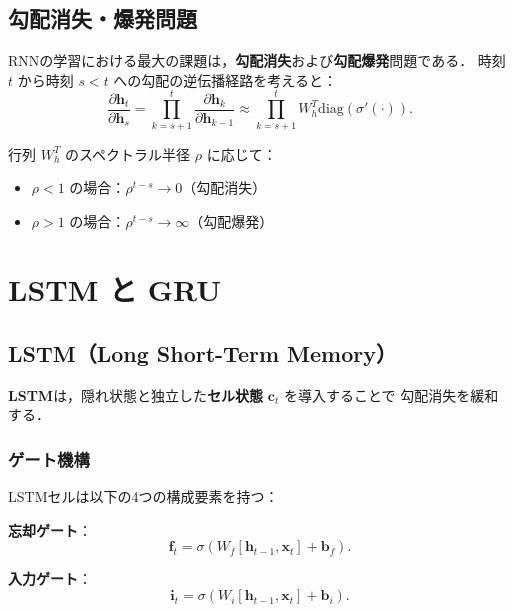 \subsection{勾配消失・爆発問題}

RNNの学習における最大の課題は，\textbf{勾配消失}および\textbf{勾配爆発}問題である．
時刻 $t$ から時刻 $s < t$ への勾配の逆伝播経路を考えると：
\begin{equation}
  \frac{\partial \boldsymbol{h}_t}{\partial \boldsymbol{h}_s} = \prod_{k=s+1}^{t} \frac{\partial \boldsymbol{h}_k}{\partial \boldsymbol{h}_{k-1}} \approx \prod_{k=s+1}^{t} W_h^T \mathrm{diag}(\sigma'(\cdot)).
\end{equation}

行列 $W_h^T$ のスペクトラル半径 $\rho$ に応じて：
\begin{itemize}
  \item $\rho < 1$ の場合：$\rho^{t-s} \to 0$（勾配消失）
  \item $\rho > 1$ の場合：$\rho^{t-s} \to \infty$（勾配爆発）
\end{itemize}

\section{LSTM と GRU}
\label{sec:lstm-gru}

\subsection{LSTM（Long Short-Term Memory）}

\textbf{LSTM}\cite{Hochreiter1997}は，隠れ状態と独立した\textbf{セル状態} $\boldsymbol{c}_t$ を導入することで
勾配消失を緩和する．

\subsubsection{ゲート機構}

LSTMセルは以下の4つの構成要素を持つ：

\textbf{忘却ゲート}：
\begin{equation}
  \boldsymbol{f}_t = \sigma(W_f[\boldsymbol{h}_{t-1}, \boldsymbol{x}_t] + \boldsymbol{b}_f).
\end{equation}

\textbf{入力ゲート}：
\begin{equation}
  \boldsymbol{i}_t = \sigma(W_i[\boldsymbol{h}_{t-1}, \boldsymbol{x}_t] + \boldsymbol{b}_i).
\end{equation}

